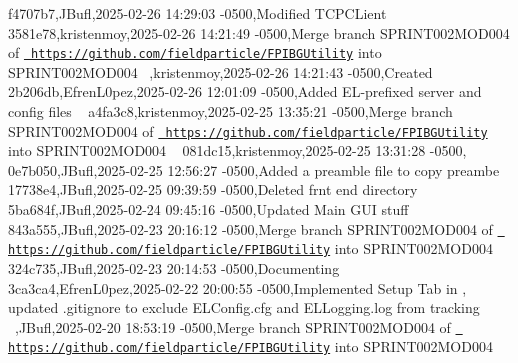  f4707b7,JBufl,2025-\/02-\/26 14\+:29\+:03 -\/0500,Modified TCPCLient ~\newline
 3581e78,kristenmoy,2025-\/02-\/26 14\+:21\+:49 -\/0500,Merge branch \textquotesingle{}SPRINT002\+MOD004\textquotesingle{} of \href{https://github.com/fieldparticle/FPIBGUtility}{\texttt{ https\+://github.\+com/fieldparticle/\+FPIBGUtility}} into SPRINT002\+MOD004 ~,kristenmoy,2025-\/02-\/26 14\+:21\+:43 -\/0500,Created  ~\newline
 2b206db,Efren\+L0pez,2025-\/02-\/26 12\+:01\+:09 -\/0500,Added EL-\/prefixed server and config files ~\newline
 a4fa3c8,kristenmoy,2025-\/02-\/25 13\+:35\+:21 -\/0500,Merge branch \textquotesingle{}SPRINT002\+MOD004\textquotesingle{} of \href{https://github.com/fieldparticle/FPIBGUtility}{\texttt{ https\+://github.\+com/fieldparticle/\+FPIBGUtility}} into SPRINT002\+MOD004 ~\newline
 081dc15,kristenmoy,2025-\/02-\/25 13\+:31\+:28 -\/0500, ~\newline
 0e7b050,JBufl,2025-\/02-\/25 12\+:56\+:27 -\/0500,Added a preamble file to copy preambe ~\newline
 17738e4,JBufl,2025-\/02-\/25 09\+:39\+:59 -\/0500,Deleted frnt end directory ~\newline
 5ba684f,JBufl,2025-\/02-\/24 09\+:45\+:16 -\/0500,Updated Main GUI stuff ~\newline
 843a555,JBufl,2025-\/02-\/23 20\+:16\+:12 -\/0500,Merge branch \textquotesingle{}SPRINT002\+MOD004\textquotesingle{} of \href{https://github.com/fieldparticle/FPIBGUtility}{\texttt{ https\+://github.\+com/fieldparticle/\+FPIBGUtility}} into SPRINT002\+MOD004 ~\newline
 324c735,JBufl,2025-\/02-\/23 20\+:14\+:53 -\/0500,Documenting ~\newline
 3ca3ca4,Efren\+L0pez,2025-\/02-\/22 20\+:00\+:55 -\/0500,Implemented Setup Tab in , updated .gitignore to exclude ELConfig.\+cfg and ELLogging.\+log from tracking ~,JBufl,2025-\/02-\/20 18\+:53\+:19 -\/0500,Merge branch \textquotesingle{}SPRINT002\+MOD004\textquotesingle{} of \href{https://github.com/fieldparticle/FPIBGUtility}{\texttt{ https\+://github.\+com/fieldparticle/\+FPIBGUtility}} into SPRINT002\+MOD004 ~\newline
